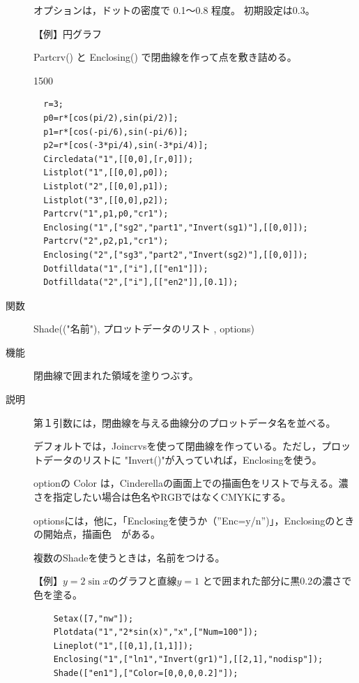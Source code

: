 \documentclass[papersize,a4paper,12pt,uplatex]{jsarticle}
\begin{document}
\begin{description}
オプションは，ドットの密度で 0.1〜0.8 程度。 初期設定は0.3。

\vspace{\baselineskip}
【例】円グラフ

Partcrv() と Enclosing() で閉曲線を作って点を敷き詰める。

\begin{layer}{150}{0}
\end{layer}
\begin{verbatim}
  r=3;
  p0=r*[cos(pi/2),sin(pi/2)];
  p1=r*[cos(-pi/6),sin(-pi/6)];
  p2=r*[cos(-3*pi/4),sin(-3*pi/4)];
  Circledata("1",[[0,0],[r,0]]);
  Listplot("1",[[0,0],p0]);
  Listplot("2",[[0,0],p1]);
  Listplot("3",[[0,0],p2]);
  Partcrv("1",p1,p0,"cr1");
  Enclosing("1",["sg2","part1","Invert(sg1)"],[[0,0]]);
  Partcrv("2",p2,p1,"cr1");
  Enclosing("2",["sg3","part2","Invert(sg2)"],[[0,0]]);
  Dotfilldata("1",["i"],[["en1"]]);
  Dotfilldata("2",["i"],[["en2"]],[0.1]);
\end{verbatim}

\vspace{\baselineskip}
\hypertarget{shade}{}
\item[関数]  Shade(("名前"), プロットデータのリスト , options)
\item[機能]  閉曲線で囲まれた領域を塗りつぶす。
\item[説明]  第１引数には，閉曲線を与える曲線分のプロットデータ名を並べる。

デフォルトでは，Joincrvsを使って閉曲線を作っている。ただし，プロットデータのリストに
"Invert()"が入っていれば，Enclosingを使う。

optionの Color は，Cinderellaの画面上での描画色をリストで与える。濃さを指定したい場合は色名やRGBではなくCMYKにする。

optionsには，他に，「Enclosingを使うか（''Enc=y/n'')」，Enclosingのときの開始点，描画色　がある。
  
複数のShadeを使うときは，名前をつける。

\vspace{\baselineskip}
【例】$y=2\sin x$のグラフと直線$y=1$ とで囲まれた部分に黒0.2の濃さで色を塗る。
\begin{verbatim}
    Setax([7,"nw"]);
    Plotdata("1","2*sin(x)","x",["Num=100"]);
    Lineplot("1",[[0,1],[1,1]]);
    Enclosing("1",["ln1","Invert(gr1)"],[[2,1],"nodisp"]);
    Shade(["en1"],["Color=[0,0,0,0.2]"]);
\end{verbatim}
\begin{center}  \end{center}


\end{description}
\end{document}
